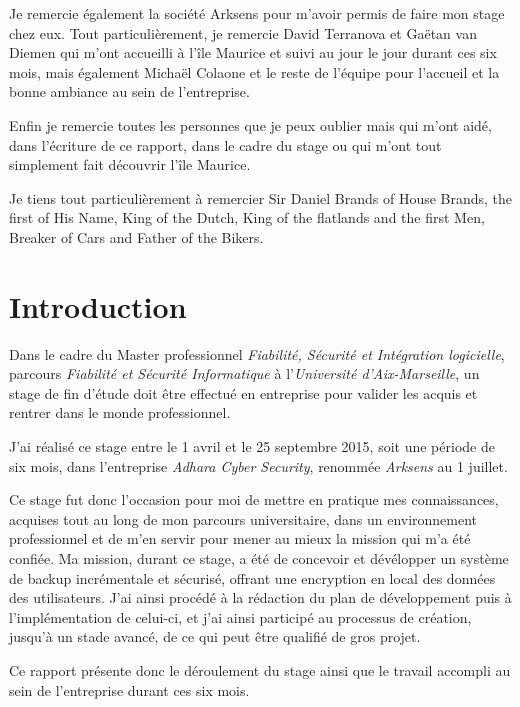 \documentclass[a4paper,10pt, twoside]{report}
\begin{document}
\begin{spacing}{1.2}
Je remercie \'egalement la soci\'et\'e Arksens pour m'avoir permis de faire mon
stage chez eux. Tout particuli\`erement, je remercie David Terranova et Ga\"etan
van Diemen qui m'ont accueilli \`a l'\^ile Maurice et suivi au jour le jour
durant ces six mois, mais \'egalement Micha\"el Colaone et le reste de
l'\'equipe pour l'accueil et la bonne ambiance au sein de l'entreprise.

Enfin je remercie toutes les personnes que je peux oublier mais qui m'ont
aid\'e, dans l'\'ecriture de ce rapport, dans le cadre du stage ou qui m'ont
tout simplement fait d\'ecouvrir l'\^ile Maurice.

Je tiens tout particuli\`erement \`a remercier Sir Daniel Brands of House Brands,
the first of His Name, King of the Dutch, King of the flatlands and the first
Men, Breaker of Cars and Father of the Bikers.

\hfill
\tableofcontents
\thispagestyle{fancy}

\chapter*{Introduction}
\thispagestyle{fancy}
Dans le cadre du Master professionnel \textit{Fiabilit\'e, S\'ecurit\'e et
Int\'egration logicielle}, parcours \textit{Fiabilit\'e et S\'ecurit\'e
Informatique} \`a l'\textit{Universit\'e d'Aix-Marseille}, un stage de fin
d'\'etude doit \^etre effectu\'e en entreprise pour valider les acquis et
rentrer dans le monde professionnel.

J'ai r\'ealis\'e ce stage entre le 1 avril et le 25 septembre 2015, soit
une p\'eriode de six mois, dans l'entreprise \textit{Adhara Cyber Security},
renomm\'ee \textit{Arksens} au 1 juillet.

Ce stage fut donc l'occasion pour moi de mettre en pratique mes connaissances,
acquises tout au long de mon parcours universitaire, dans un environnement
professionnel et de m'en servir pour mener au mieux la mission qui m'a
\'et\'e confi\'ee. Ma mission, durant ce stage, a \'et\'e de concevoir et
d\'ev\'elopper un syst\`eme de backup incr\'ementale et s\'ecuris\'e, offrant
une encryption en local des donn\'ees des utilisateurs. J'ai ainsi proc\'ed\'e
\`a la r\'edaction du plan de d\'eveloppement puis \`a l'impl\'ementation de
celui-ci, et j'ai ainsi particip\'e au processus de cr\'eation, jusqu'\`a un
stade avanc\'e, de ce qui peut \^etre qualifi\'e de gros projet.

Ce rapport pr\'esente donc le d\'eroulement du stage ainsi que le travail
accompli au sein de l'entreprise durant ces six mois.



\end{spacing}
\end{document}
